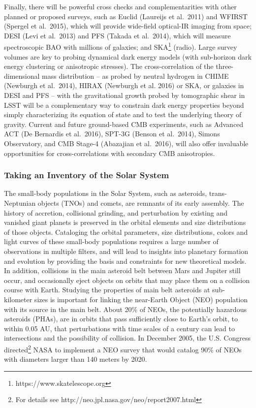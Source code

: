 Finally, there will be powerful cross checks and complementarities with other planned or
proposed surveys, such as Euclid (Laureijs et al.~2011) and WFIRST 
(Spergel et al.~2015), which will provide 
wide-field optical-IR imaging from space;
DESI (Levi et al.~2013)
and PFS (Takada et al.~2014), which will measure 
spectroscopic BAO with 
millions of galaxies; and SKA\footnote{https://www.skatelescope.org} (radio).
Large survey volumes are key to probing dynamical dark energy models (with sub-horizon
dark energy clustering or anisotropic stresses). The cross-correlation
of the three-dimensional
mass distribution -- as probed by neutral hydrogen in CHIME (Newburgh et al.~2014), HIRAX (Newburgh
et al. 2016) or SKA, or galaxies in DESI and PFS -- with the gravitational growth
probed by tomographic shear in LSST will be a complementary way to constrain dark energy
properties beyond simply characterizing its equation of state and to test the underlying theory of gravity.
Current and future ground-based CMB experiments, such as Advanced ACT (De Bernardis et al.~2016), 
SPT-3G (Benson et al.~2014), Simons Observatory, and CMB Stage-4 (Abazajian et al.~2016), will also offer invaluable opportunities for 
cross-correlations with secondary CMB anisotropies.



\subsubsection{Taking an Inventory of the Solar System}


The small-body populations in the Solar System, such as asteroids, trans-Neptunian objects (TNOs)
and comets, are remnants of its early assembly. The history of accretion, collisional grinding, and
perturbation by existing and vanished giant planets is preserved in the orbital elements and size
distributions of those objects. Cataloging the orbital parameters, size distributions, colors and light
curves of these small-body populations requires a large number of observations in multiple filters,
and will lead to insights into planetary formation and evolution by providing the basis and constraints
for new theoretical models. In addition, collisions in the main asteroid belt between Mars and Jupiter
still occur, and occasionally eject objects on orbits that may place them on a collision course with Earth.
Studying the properties of main belt asteroids at sub-kilometer sizes is important for linking the near-Earth
Object (NEO) population with its source in the main belt. About 20\% of NEOs, the potentially hazardous
asteroids (PHAs), are in orbits that pass sufficiently close to Earth's orbit, to within 0.05 AU, that perturbations
with time scales of a century can lead to intersections and the possibility of collision. In December 2005,
the U.S. Congress directed\footnote{For details see http://neo.jpl.nasa.gov/neo/report2007.html} NASA to
implement a NEO survey that would catalog 90\% of NEOs with diameters larger than 140 meters by 2020.


